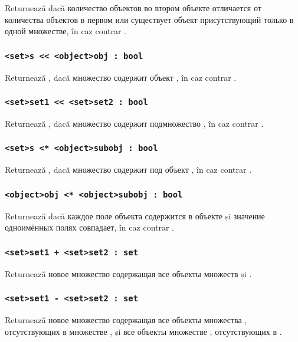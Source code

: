Returnează \true{} dacă количество объектов во втором объекте отличается от количества объектов в первом или существует объект присутствующий только в одной множестве, în caz contrar \false{}.

\subsubsection{\lstinline`<set>s << <object>obj : bool`}

Returnează \true{}, dacă множество  содержит объект , în caz contrar \false{}.

\subsubsection{\lstinline|<set>set1 << <set>set2 : bool|}

Returnează \true, dacă множество  содержит подмножество , în caz contrar \false.

\subsubsection{\lstinline`<set>s <* <object>subobj : bool`}

Returnează \true{}, dacă множество  содержит под объект , în caz contrar \false{}.

\subsubsection{\lstinline`<object>obj <* <object>subobj : bool`}

Returnează \true{} dacă каждое поле объекта  содержится в объекте  și значение одноимённых полях совпадает, în caz contrar \false{}.

\subsubsection{\lstinline`<set>set1 + <set>set2 : set`}

Returnează новое множество содержащая все объекты множеств  și .

\subsubsection{\lstinline`<set>set1 - <set>set2 : set`}

Returnează новое множество содержащая все объекты множества , отсутствующих в множестве , și все объекты множестве , отсутствующих в .

